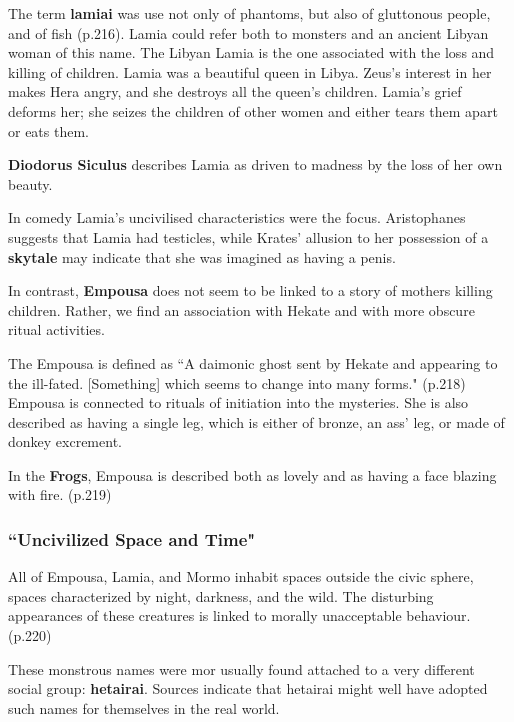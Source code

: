 The term \textbf{lamiai} was use not only of phantoms, but also of gluttonous people, and of fish (p.216). Lamia could refer both to monsters and an ancient Libyan woman of this name. The Libyan Lamia is the one associated with the loss and killing of children. Lamia was a beautiful queen in Libya. Zeus's interest in her makes Hera angry, and she destroys all the queen's children. Lamia's grief deforms her; she seizes the children of other women and either tears them apart or eats them.

\textbf{Diodorus Siculus} describes Lamia as driven to madness by the loss of her own beauty.

In comedy Lamia's uncivilised characteristics were the focus. Aristophanes suggests that Lamia had testicles, while Krates' allusion to her possession of a \textbf{skytale} may indicate that she was imagined as having a penis.

\begin{rmk}
    In contrast, \textbf{Empousa} does not seem to be linked to a story of mothers killing children. Rather, we find an association with Hekate and with more obscure ritual activities.
\end{rmk}

The Empousa is defined as ``A daimonic ghost sent by Hekate and appearing to the ill-fated. [Something] which seems to change into many forms." (p.218) Empousa is connected to rituals of initiation into the mysteries. She is also described as having a single leg, which is either of bronze, an ass' leg, or made of donkey excrement.

\begin{nte}
    In the \textbf{Frogs}, Empousa is described both as lovely and as having a face blazing with fire. (p.219)
\end{nte}


\subsubsection{``Uncivilized Space and Time"}

All of Empousa, Lamia, and Mormo inhabit spaces outside the civic sphere, spaces characterized by night, darkness, and the wild. The disturbing appearances of these creatures is linked to morally unacceptable behaviour. (p.220)

\begin{rmk}
    These monstrous names were mor usually found attached to a very different social group: \textbf{hetairai}. Sources indicate that hetairai might well have adopted such names for themselves in the real world.
\end{rmk}

